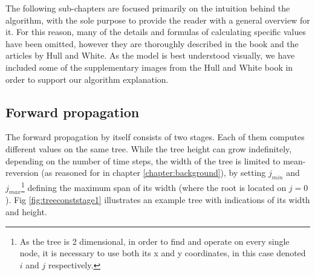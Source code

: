 The following sub-chapters are focused primarily on the intuition behind the algorithm, with the sole purpose to provide the reader with a general overview for it. For this reason, many of the details and formulas of calculating specific values have been omitted, however they are thoroughly described in the book and the articles by Hull and White. As the model is best understood visually, we have included some of the supplementary images from the Hull and White book in order to support our algorithm explanation. 

\subsection{Forward propagation}
The forward propagation by itself consists of two stages. Each of them computes different values on the same tree. While the tree height can grow indefinitely, depending on the number of time steps, the width of the tree is limited to mean-reversion (as reasoned for in chapter \ref{chapter:background}), by setting $j_{min}$ and $j_{max}$\footnote{As the tree is 2 dimensional, in order to find and operate on every single node, it is necessary to use both its x and y coordinates, in this case denoted $i$ and $j$ respectively.} defining the maximum span of its width (where the root is located on $j=0$). Fig \ref{fig:treeconststage1} illustrates an example tree with indications of its width and height. 

